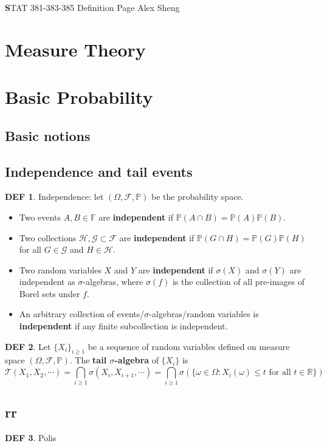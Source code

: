 \documentclass[hidelinks,11pt]{article}
\theoremstyle{definition}
\newtheorem*{defin}{DEF}
\theoremstyle{dotless}
\theoremstyle{remark}
\DeclareMathOperator{\1}{\mathbf{1}}
\begin{document}
\begin{center}
{\Large\textbf STAT 381-383-385 \hspace{0.1cm} Definition Page}\medbreak
\large{Alex Sheng}
\end{center}

\section{Measure Theory}

\section{Basic Probability}

\subsection{Basic notions}

\subsection{Independence and tail events}

\begin{defin}
Independence: let $(\Omega,\mathcal{F},\mathbb{P})$ be the probability space.\begin{itemize}
    \item Two events $A,B\in\mathbb{F}$ are \textbf{independent} if $\mathbb{P}(A\cap B)=\mathbb{P}(A)\mathbb{P}(B)$.
    \item Two collections $\mathcal{H},\mathcal{G}\subset\mathcal{F}$ are \textbf{independent} if $\mathbb{P}(G\cap H)=\mathbb{P}(G)\mathbb{P}(H)$ for all $G\in\mathcal{G}$ and $H\in\mathcal{H}$.
    \item Two random variables $X$ and $Y$ are \textbf{independent} if $\sigma(X)$ and $\sigma(Y)$ are independent as $\sigma$-algebras, where $\sigma(f)$ is the collection of all pre-images of Borel sets under $f$.
    \item An arbitrary collection of events/$\sigma$-algebras/random variables is \textbf{independent} if any finite subcollection is independent.
\end{itemize}
\end{defin}

\begin{defin}
Let $\{X_i\}_{i\geq1}$ be a sequence of random variables defined on measure space $(\Omega,\mathcal{F},\mathbb{P})$. The \textbf{tail $\sigma$-algebra} of $\{X_i\}$ is
\[\mathcal{T}(X_1,X_2,\cdots)=\bigcap_{i\geq1}\sigma(X_i,X_{i+1},\cdots)=\bigcap_{i\geq1}\sigma(\{\omega\in\Omega:X_i(\omega)\leq t\textrm{ for all }t\in\mathbb{R}\})\]
\end{defin}

\subsection{rr}

\begin{defin}
Polis
\end{defin}
\end{document}
